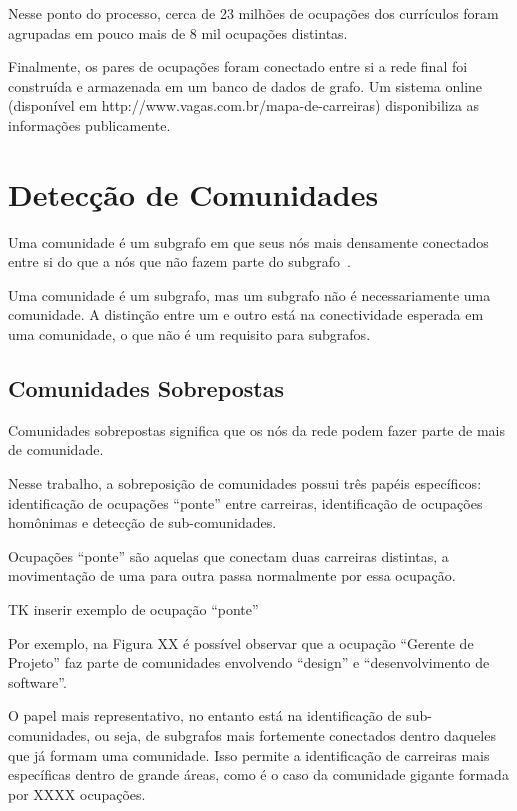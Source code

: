 \documentclass[
  article,
  11pt,
  a4paper,
  english,
  brazil,
  sumario=tradicional]{abntex2}
\begin{document}
Nesse ponto do processo, cerca de 23 milhões de ocupações dos currículos foram agrupadas em pouco mais de 8 mil ocupações distintas.

Finalmente, os pares de ocupações foram conectado entre si a rede final foi construída e armazenada em um banco de dados de grafo. Um sistema online (disponível em http://www.vagas.com.br/mapa-de-carreiras) disponibiliza as informações publicamente.

\section{Detecção de Comunidades}

Uma comunidade é um subgrafo em que seus nós mais densamente conectados entre si do que a nós que não fazem parte do subgrafo~\cite{Barabasi2016-rn,Ahn2010-uh}.

Uma comunidade é um subgrafo, mas um subgrafo não é necessariamente uma comunidade. A distinção entre um e outro está na conectividade esperada em uma comunidade, o que não é um requisito para subgrafos.

\subsection{Comunidades Sobrepostas} \label{sec:comunidades-sobrepostas}

Comunidades sobrepostas significa que os nós da rede podem fazer parte de mais de comunidade.

Nesse trabalho, a sobreposição de comunidades possui três papéis específicos: identificação de ocupações \enquote{ponte} entre carreiras, identificação de ocupações homônimas e detecção de sub-comunidades.

Ocupações \enquote{ponte} são aquelas que conectam duas carreiras distintas, a movimentação de uma para outra passa normalmente por essa ocupação.

TK inserir exemplo de ocupação \enquote{ponte}

Por exemplo, na Figura XX é possível observar que a ocupação \enquote{Gerente de Projeto} faz parte de comunidades envolvendo \enquote{design} e \enquote{desenvolvimento de software}.

O papel mais representativo, no entanto está na identificação de sub-comunidades, ou seja, de subgrafos mais fortemente conectados dentro daqueles que já formam uma comunidade. Isso permite a identificação de carreiras mais específicas dentro de grande áreas, como é o caso da comunidade gigante formada por XXXX ocupações.
\end{document}
